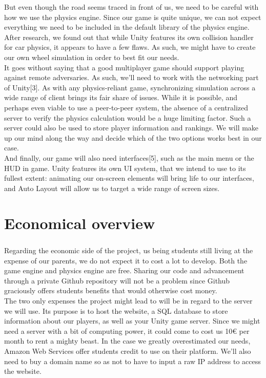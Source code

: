 But even though the road seems traced in front of us, we need to be careful with how we use the physics engine. Since our game is quite unique, we can not expect everything we need to be included in the default library of the physics engine. After research, we found out that while Unity features its own collision handler for car physics, it appears to have a few flaws. As such, we might have to create our own wheel simulation in order to best fit our needs.\\

It goes without saying that a good multiplayer game should support playing against remote adversaries. As such, we’ll need to work with the networking part of Unity[3]. As with any physics-reliant game, synchronizing simulation across a wide range of client brings its fair share of issues. While it is possible, and perhaps even viable to use a peer-to-peer system, the absence of a centralized server to verify the physics calculation would be a huge limiting factor. Such a server could also be used to store player information and rankings. We will make up our mind along the way and decide which of the two options works best in our case.\\

And finally, our game will also need interfaces[5], such as the main menu or the HUD in game. Unity features its own UI system, that we intend to use to its fullest extent: animating our on-screen elements will bring life to our interfaces, and Auto Layout will allow us to target a wide range of screen sizes.\\

\chapter{Economical overview}

\paragraph{}Regarding the economic side of the project, us being students still living at the expense of our parents, we do not expect it to cost a lot to develop. Both the game engine and physics engine are free. Sharing our code and advancement through a private Github repository will not be a problem since Github graciously offers students benefits that would otherwise cost money.\\

The two only expenses the project might lead to will be in regard to the server we will use. Its purpose is to host the website, a SQL database to store information about our players, as well as your Unity game server. Since we might need a server with a bit of computing power, it could come to cost us 10\euro{} per month to rent a mighty beast. In the case we greatly overestimated our needs, Amazon Web Services offer students credit to use on their platform. We’ll also need to buy a domain name so as not to have to input a raw IP address to access the website.\\

